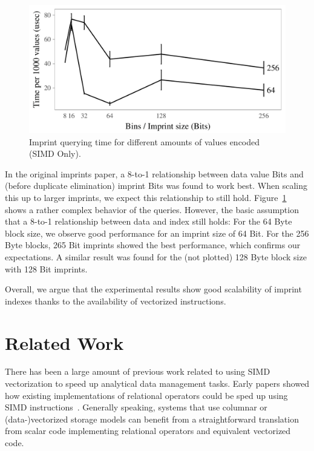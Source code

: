 \documentclass[sigconf]{acmart}
\begin{document}
\begin{figure}[ht]
\begin{center}
\includegraphics[width=\columnwidth,trim=0mm 0mm 0mm 0mm,clip]{qblocksize2.pdf}
\end{center}
\caption{Imprint querying time for different amounts of values encoded (SIMD Only).\label{fig:qblocksize2}}
\end{figure}

In the original imprints paper, a 8-to-1 relationship between data value Bits and (before duplicate elimination) imprint Bits was found to work best. When scaling this up to larger imprints, we expect this relationship to still hold. Figure~\ref{fig:qblocksize2} shows a rather complex behavior of the queries. However, the basic assumption that a 8-to-1 relationship between data and index still holds: For the 64 Byte block size, we observe good performance for an imprint size of 64 Bit. For the 256 Byte blocks, 265 Bit imprints showed the best performance, which confirms our expectations. A similar result was found for the (not plotted) 128 Byte block size with 128 Bit imprints.

Overall, we argue that the experimental results show good scalability of imprint indexes thanks to the availability of vectorized instructions.

\section{Related Work}
There has been a large amount of previous work related to using SIMD vectorization to speed up analytical data management tasks.  
Early papers showed how existing implementations of relational operators could be sped up using SIMD instructions~\cite{DBLP:conf/sigmod/ZhouR02}. Generally speaking, systems that use columnar or (data-)vectorized storage models can benefit from a straightforward translation from scalar code implementing relational operators and equivalent vectorized code. 
\end{document}

